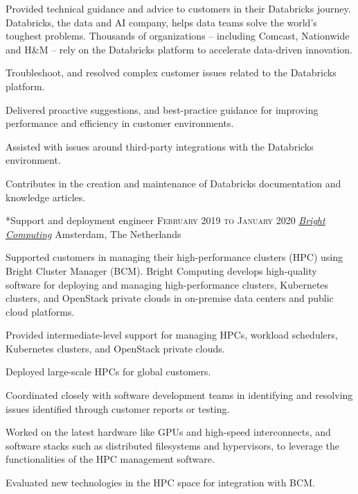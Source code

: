 \documentclass[10pt, a4paper, final]{article}
\begin{document}
\begin{section}
\begin{subsection}
    Provided technical guidance and advice to customers in their Databricks journey. Databricks, the data and AI company, helps data teams solve the world's toughest problems. Thousands of organizations -- including Comcast, Nationwide and H{\&}M -- rely on the Databricks platform to accelerate data-driven innovation.
    \vspace{1em}
    \begin{compactitem}
      \item Troubleshoot, and resolved complex customer issues related to the Databricks platform.
      \item Delivered proactive suggestions, and best-practice guidance for improving performance and efficiency in customer environments.
      \item Assisted with issues around third-party integrations with the Databricks environment.
      \item Contributes in the creation and maintenance of Databricks documentation and knowledge articles.
      
    \end{compactitem}
  \end{subsection}
  \vspace{2em}

  \begin{subsection}*{Support and deployment engineer \hfill\textsc{February 2019 to January 2020}}
    \href{https://www.brightcomputing.com/}{\textit{Bright Computing}} \hfill Amsterdam, The Netherlands
    \vspace{1em}

    Supported customers in managing their high-performance clusters (HPC) using Bright Cluster Manager (BCM). Bright Computing develops high-quality software for deploying and managing high-performance clusters, Kubernetes clusters, and OpenStack private clouds in on-premise data centers and public cloud platforms.
    \vspace{1em}
    \begin{compactitem}
      \item Provided intermediate-level support for managing HPCs, workload schedulers, Kubernetes clusters, and OpenStack private clouds.
      \item Deployed large-scale HPCs for global customers.
      \item Coordinated closely with software development teams in identifying and resolving issues identified through customer reports or testing.
      \item Worked on the latest hardware like GPUs and high-speed interconnects, and software stacks such as distributed filesystems and hypervisors, to leverage the functionalities of the HPC management software.
      \item Evaluated new technologies in the HPC space for integration with BCM.
      

\end{compactitem}
\end{subsection}
\end{section}
\end{document}
